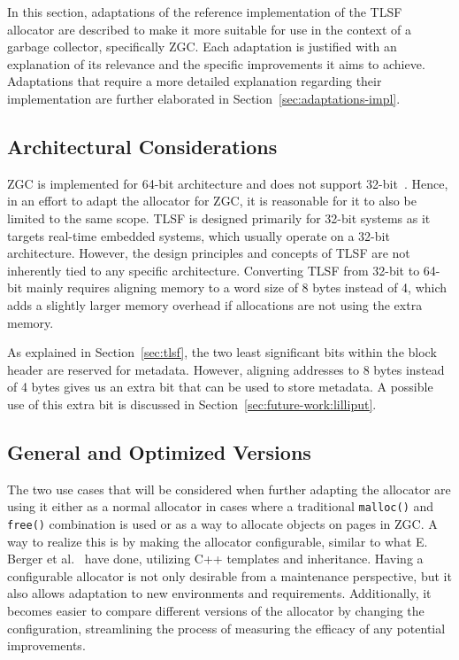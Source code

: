 
In this section, adaptations of the reference implementation of the TLSF allocator are described to make it more suitable for use in the context of a garbage collector, specifically ZGC. Each adaptation is justified with an explanation of its relevance and the specific improvements it aims to achieve. Adaptations that require a more detailed explanation regarding their implementation are further elaborated in Section~\ref{sec:adaptations-impl}.

\subsection{Architectural Considerations}
\label{sec:adaptations:architectural-considerations}

ZGC is implemented for 64-bit architecture and does not support 32-bit~\cite{zgc:deep_dive}. Hence, in an effort to adapt the allocator for ZGC, it is reasonable for it to also be limited to the same scope. TLSF is designed primarily for 32-bit systems as it targets real-time embedded systems, which usually operate on a 32-bit architecture. However, the design principles and concepts of TLSF are not inherently tied to any specific architecture. Converting TLSF from 32-bit to 64-bit mainly requires aligning memory to a word size of 8 bytes instead of 4, which adds a slightly larger memory overhead if allocations are not using the extra memory.

As explained in Section~\ref{sec:tlsf}, the two least significant bits within the block header are reserved for metadata. However, aligning addresses to 8 bytes instead of 4 bytes gives us an extra bit that can be used to store metadata. A possible use of this extra bit is discussed in Section~\ref{sec:future-work:lilliput}.

\subsection{General and Optimized Versions}

The two use cases that will be considered when further adapting the allocator are using it either as a normal allocator in cases where a traditional \texttt{malloc()} and \texttt{free()} combination is used or as a way to allocate objects on pages in ZGC. A way to realize this is by making the allocator configurable, similar to what E. Berger et al.~\cite{configurable_allocator} have done, utilizing C++ templates and inheritance. Having a configurable allocator is not only desirable from a maintenance perspective, but it also allows adaptation to new environments and requirements. Additionally, it becomes easier to compare different versions of the allocator by changing the configuration, streamlining the process of measuring the efficacy of any potential improvements.

